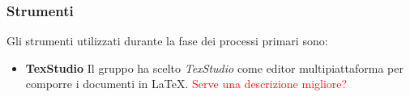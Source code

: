\subsubsection{Strumenti}
Gli strumenti utilizzati durante la fase dei processi primari sono:
\begin{itemize}
	\item \textbf{TexStudio}
	Il gruppo ha scelto \emph{TexStudio} come editor multipiattaforma per comporre i documenti in \LaTeX. \textcolor{red}{Serve una descrizione migliore?}
\end{itemize}	

